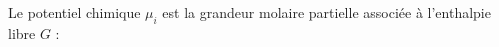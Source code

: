 ﻿\documentclass[a4paper]{article}
\begin{document}
\pagestyle{fancy}
\fancyhf{}
\setlength{\headheight}{15pt}

\begin{center}
	\large{}
\end{center}


Le potentiel chimique \(\mu_i\) est la grandeur molaire partielle associée à l'enthalpie libre \(G\) :
\begin{center}
\end{center}
\end{document}
